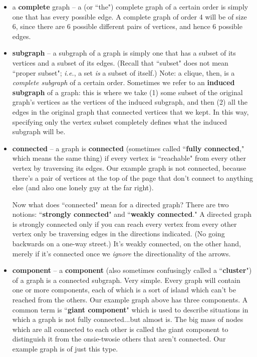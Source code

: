 \documentclass[12pt]{article}
\begin{document}
\begin{itemize}
\item a \textbf{complete} graph -- a (or ``the") complete graph of a certain
order is simply one that has every possible edge. A complete graph of order 4
will be of size 6, since there are 6 possible different pairs of vertices, and
hence 6 possible edges.

\item \textbf{subgraph} -- a subgraph of a graph is simply one that has a
subset of its vertices and a subset of its edges. (Recall that ``subset" does
not mean ``proper subset"; \textit{i.e.}, a set \textit{is} a subset of
itself.) Note: a clique, then, is a \textit{complete subgraph} of a certain
order. Sometimes we refer to an \textbf{induced subgraph} of a graph: this is
where we take (1) some subset of the original graph's vertices as the vertices
of the induced subgraph, and then (2) all the edges in the original graph that
connected vertices that we kept. In this way, specifying only the vertex
subset completely defines what the induced subgraph will be.

\item \textbf{connected} -- a graph is \textbf{connected} (sometimes called
``\textbf{fully connected}," which means the same thing) if every vertex is
``reachable" from every other vertex by traversing its edges. Our example
graph is not connected, because there's a pair of vertices at the top of the
page that don't connect to anything else (and also one lonely guy at the far
right).

Now what does ``connected" mean for a directed graph? There are two notions:
``\textbf{strongly connected}" and ``\textbf{weakly connected}." A directed
graph is strongly connected only if you can reach every vertex from every
other vertex only be traversing edges in the directions indicated. (No going
backwards on a one-way street.) It's weakly connected, on the other hand,
merely if it's connected once we \textit{ignore} the directionality of the
arrows.

\item \textbf{component} -- a \textbf{component} (also sometimes confusingly
called a ``\textbf{cluster}") of a graph is a connected subgraph. Very simple.
Every graph will contain one or more components, each of which is a sort of
island which can't be reached from the others. Our example graph above has
three components. A common term is ``\textbf{giant component}" which is used
to describe situations in which a graph is not fully connected...but almost
is. The big mass of nodes which are all connected to each other is called the
giant component to distinguish it from the onsie-twosie others that aren't
connected. Our example graph is of just this type.


\end{itemize}
\end{document}
